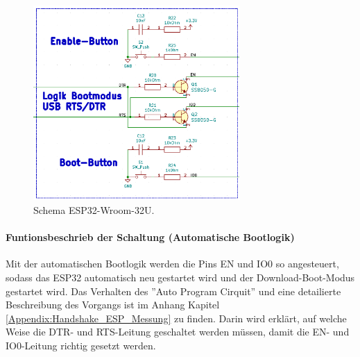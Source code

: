 \begin{figure}[H]
	\centering
	\includegraphics[width=0.7\textwidth]{graphics/Schema_ESP32_Flashbuttons}
	\caption{Schema ESP32-Wroom-32U.}
	\label{fig:Schema_ESP32_Flashbuttons}
\end{figure}

\paragraph{Funtionsbeschrieb der Schaltung (Automatische Bootlogik)}\mbox{}

Mit der automatischen Bootlogik werden die Pins EN und IO0 so angesteuert, sodass das ESP32 automatisch neu gestartet wird und der Download-Boot-Modus gestartet wird. Das Verhalten des ''Auto Program Cirquit'' und eine detailierte Beschreibung des Vorgangs ist im Anhang Kapitel \ref{Appendix:Handshake_ESP_Messung} zu finden. Darin wird erklärt, auf welche Weise die DTR- und RTS-Leitung geschaltet werden müssen, damit die EN- und IO0-Leitung richtig gesetzt werden.